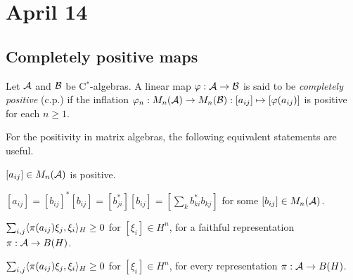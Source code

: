 \documentclass{../../small}
\begin{document}
\section{April 14}



\subsection{Completely positive maps}

\begin{defn}
Let $\mathcal{A}$ and $\mathcal{B}$ be C$^*$-algebras.
A linear map $\varphi:\mathcal{A}\to\mathcal{B}$ is said to be \emph{completely positive} (c.p.) if the inflation $\varphi_n:M_n(\mathcal{A})\to M_n(\mathcal{B}):[a_{ij}]\mapsto[\varphi(a_{ij})]$ is positive for each $n\ge1$.
\end{defn}

\begin{rmk}
For the positivity in matrix algebras, the following equivalent statements are useful.
\begin{parts}
\item $[a_{ij}]\in M_n(\mathcal{A})$ is positive.
\item $[a_{ij}]=[b_{ij}]^*[b_{ij}]=[b_{ji}^*][b_{ij}]=[\sum_kb_{ki}^*b_{kj}]$ for some $[b_{ij}]\in M_n(\mathcal{A})$.
\item $\sum_{i,j}\langle\pi(a_{ij})\xi_j,\xi_i\rangle_H\ge0$ for $[\xi_i]\in H^n$, for a faithful representation $\pi:\mathcal{A}\to B(H)$.
\item $\sum_{i,j}\langle\pi(a_{ij})\xi_j,\xi_i\rangle_H\ge0$ for $[\xi_i]\in H^n$, for every representation $\pi:\mathcal{A}\to B(H)$.
\end{parts}
\end{rmk}
\end{document}
